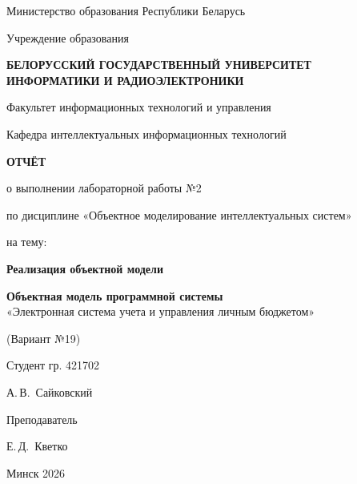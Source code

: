 \documentclass[14pt,a4paper]{extarticle}
\newcommand{\StudentGroup}{421702}
\newcommand{\StudentName}{А.\,В.~Сайковский}
\newcommand{\TeacherName}{Е.\,Д.~Кветко}
\newcommand{\VariantNumber}{19}
\newcommand{\DisciplineName}{Объектное моделирование интеллектуальных систем}
\newcommand{\LabNumber}{2}
\newcommand{\LabTitle}{Реализация объектной модели}
\newcommand{\SystemTitle}{Электронная система учета и управления личным бюджетом}
\begin{document}
\justifying
\pagestyle{plain}


\begin{titlepage}
\thispagestyle{empty}

\begin{center}

Министерство образования Республики Беларусь

Учреждение образования

\vspace{0.2cm}

\textbf{БЕЛОРУССКИЙ ГОСУДАРСТВЕННЫЙ УНИВЕРСИТЕТ}\\
\textbf{ИНФОРМАТИКИ И РАДИОЭЛЕКТРОНИКИ}

\vspace{0.3cm}

Факультет информационных технологий и управления

Кафедра интеллектуальных информационных технологий

\vfill

{\Large\textbf{ОТЧЁТ}}

\vspace{0.4cm}

о выполнении лабораторной работы №\LabNumber

по дисциплине «\DisciplineName»

\vspace{0.4cm}

на тему:

\vspace{0.3cm}

{\large\textbf{\LabTitle}}

\vspace{0.4cm}

\textbf{Объектная модель программной системы}\\
«\SystemTitle»

\vspace{0.3cm}

(Вариант №\VariantNumber)

\vfill

\end{center}

\begin{flushright}
\begin{minipage}{0.48\textwidth}

Студент гр. \StudentGroup

\StudentName

\vspace{0.6cm}

Преподаватель

\TeacherName

\end{minipage}
\end{flushright}

\vfill

\begin{center}
Минск 2026
\end{center}

\end{titlepage}
\end{document}
